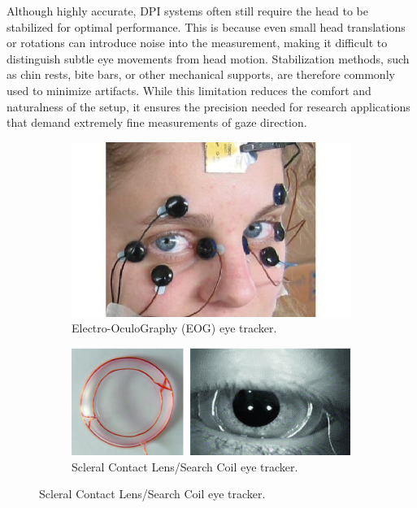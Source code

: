 \documentclass[12pt]{report}
\begin{document}
Although highly accurate, DPI systems often still require the head to be stabilized for optimal performance. 
This is because even small head translations or rotations can introduce noise into the measurement, making it difficult to distinguish subtle eye movements from head motion. Stabilization methods, such as chin rests, bite bars, or other mechanical supports, are therefore commonly used to minimize artifacts.
While this limitation reduces the comfort and naturalness of the setup, it ensures the precision needed for research applications that demand extremely fine measurements of gaze direction.

\begin{figure}[ht]
    \centering
    \begin{subfigure}[b]{0.45\textwidth}
        \centering
        \includegraphics[width=1\textwidth,height=0.6\textwidth]{Images/Theory/eog.png}
        \caption{Electro-OculoGraphy (EOG) eye tracker.}
        \label{fig:eog}
    \end{subfigure}
    \hfill
    \begin{subfigure}[b]{0.45\textwidth}
        \centering
        \includegraphics[width=1\textwidth,height=0.6\textwidth]{Images/Theory/coil.png}
        \caption{Scleral Contact Lens/Search Coil eye tracker.}
        \label{fig:coil}
    \end{subfigure}
    

\end{figure}
\end{document}
